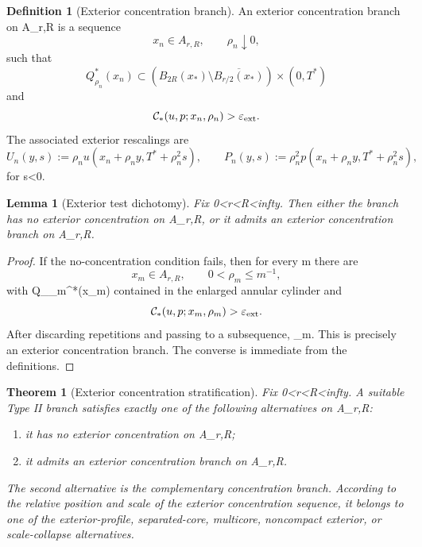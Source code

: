 \documentclass[11pt]{amsart}
\def\({}%
\def\){}%
\def\infty{infty}%
\theoremstyle{plain}
\newtheorem{theorem}{Theorem}[section]
\newtheorem{lemma}[lemma]{Lemma}
\theoremstyle{definition}
\newtheorem{definition}[definition]{Definition}
\theoremstyle{remark}
\begin{document}
\begin{definition}[Exterior concentration branch]
\label{paper8:def:exterior-concentration-branch}
An exterior concentration branch on \(A_{r,R}\) is a sequence
\[
  x_n\in A_{r,R},\qquad \rho_n\downarrow0,
\]
such that
\[
  Q_{\rho_n}^*(x_n)\subset
  (B_{2R}(x_*)\setminus \overline{B_{r/2}(x_*)})\times(0,T^*)
\]
and
\[
  \mathcal C_*(u,p;x_n,\rho_n)>\varepsilon_{\rm ext}.
\]
The associated exterior rescalings are
\[
  U_n(y,s):=\rho_n u(x_n+\rho_n y,T^*+\rho_n^2s),
  \qquad
  P_n(y,s):=\rho_n^2 p(x_n+\rho_n y,T^*+\rho_n^2s),
\]
for \(s<0\).
\end{definition}

\begin{lemma}[Exterior test dichotomy]
\label{paper8:lem:exterior-test-dichotomy}
Fix \(0<r<R<\infty\).  Then either the branch has no exterior concentration
on \(A_{r,R}\), or it admits an exterior concentration branch on \(A_{r,R}\).
\end{lemma}

\begin{proof}
If the no-concentration condition fails, then for every \(m\) there are
\[
  x_m\in A_{r,R},\qquad 0<\rho_m\le m^{-1},
\]
with \(Q_{\rho_m}^*(x_m)\) contained in the enlarged annular cylinder and
\[
  \mathcal C_*(u,p;x_m,\rho_m)>\varepsilon_{\rm ext}.
\]
After discarding repetitions and passing to a subsequence, \(\rho_m\).
This is precisely an exterior concentration branch.  The converse is immediate
from the definitions.
\end{proof}

\begin{theorem}[Exterior concentration stratification]
\label{paper8:thm:exterior-stratification}
Fix \(0<r<R<\infty\).  A suitable Type II branch satisfies exactly one of the
following alternatives on \(A_{r,R}\):
\begin{enumerate}[label=\textup{(\roman*)}]
\item it has no exterior concentration on \(A_{r,R}\);
\item it admits an exterior concentration branch on \(A_{r,R}\).
\end{enumerate}
The second alternative is the complementary concentration branch.  According
to the relative position and scale of the exterior concentration sequence, it
belongs to one of the exterior-profile, separated-core, multicore, noncompact
exterior, or scale-collapse alternatives.
\end{theorem}
\end{document}
